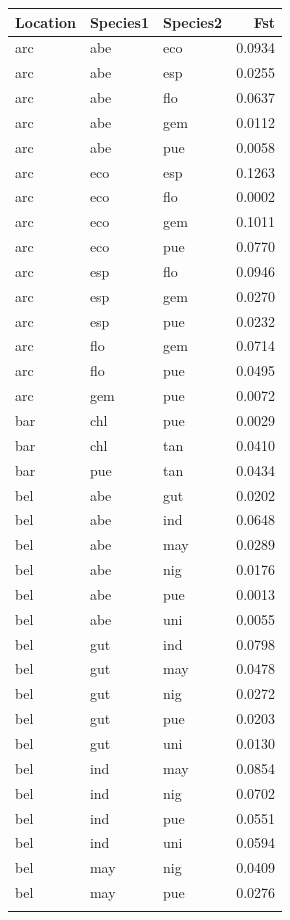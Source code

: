 
\begin{tabular}{lllr}
\toprule
Location & Species1 & Species2 & Fst\\
\midrule
arc & abe & eco & 0.0934\\
arc & abe & esp & 0.0255\\
arc & abe & flo & 0.0637\\
arc & abe & gem & 0.0112\\
arc & abe & pue & 0.0058\\
\addlinespace
arc & eco & esp & 0.1263\\
arc & eco & flo & 0.0002\\
arc & eco & gem & 0.1011\\
arc & eco & pue & 0.0770\\
arc & esp & flo & 0.0946\\
\addlinespace
arc & esp & gem & 0.0270\\
arc & esp & pue & 0.0232\\
arc & flo & gem & 0.0714\\
arc & flo & pue & 0.0495\\
arc & gem & pue & 0.0072\\
\addlinespace
bar & chl & pue & 0.0029\\
bar & chl & tan & 0.0410\\
bar & pue & tan & 0.0434\\
bel & abe & gut & 0.0202\\
bel & abe & ind & 0.0648\\
\addlinespace
bel & abe & may & 0.0289\\
bel & abe & nig & 0.0176\\
bel & abe & pue & 0.0013\\
bel & abe & uni & 0.0055\\
bel & gut & ind & 0.0798\\
\addlinespace
bel & gut & may & 0.0478\\
bel & gut & nig & 0.0272\\
bel & gut & pue & 0.0203\\
bel & gut & uni & 0.0130\\
bel & ind & may & 0.0854\\
\addlinespace
bel & ind & nig & 0.0702\\
bel & ind & pue & 0.0551\\
bel & ind & uni & 0.0594\\
bel & may & nig & 0.0409\\
bel & may & pue & 0.0276\\
\addlinespace

\end{tabular}
